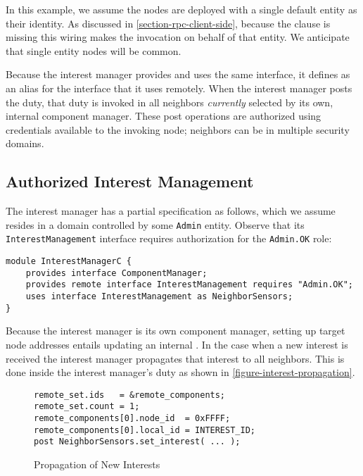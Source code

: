 In this example, we assume the nodes are deployed with a single default
entity as their identity. As discussed in
\autoref{section-rpc-client-side}, because the  clause is
missing this wiring makes the invocation on behalf of that entity. We
anticipate that single entity nodes will be common.

Because the interest manager provides and uses the same interface, it
defines  as an alias for the
 interface that it uses remotely. When the
interest manager posts the  duty, that duty is
invoked in all neighbors \emph{currently} selected by its own, internal
component manager. These post operations are authorized using
credentials available to the invoking node; neighbors can be in multiple
security domains.

\subsection{Authorized Interest Management}

The interest manager has a partial specification as follows, which we
assume resides in a domain controlled by some \texttt{Admin} entity.
Observe that its \texttt{InterestManagement} interface requires
authorization for the \texttt{Admin.OK} role:

\begin{lrbox}{\savebigbox}
\begin{minipage}{4.9in}
\vspace{0.6em}
\begin{Verbatim}[fontsize=\small]
module InterestManagerC {
    provides interface ComponentManager;
    provides remote interface InterestManagement requires "Admin.OK";
    uses interface InterestManagement as NeighborSensors;
}
\end{Verbatim}
\vspace{0.3em}
\end{minipage}
\end{lrbox}
\centerline{\usebox{\savebigbox}}

Because the interest manager is its own component manager, setting up
target node addresses entails updating an internal
. In the case when a new interest is received the
interest manager propagates that interest to all neighbors. This is done
inside the interest manager's  duty as shown in
\autoref{figure-interest-propagation}.

\begin{figure}[!t]
\begin{textbox}{3.25in}
\begin{Verbatim}[fontsize=\small]
remote_set.ids   = &remote_components;
remote_set.count = 1;
remote_components[0].node_id  = 0xFFFF;
remote_components[0].local_id = INTEREST_ID;
post NeighborSensors.set_interest( ... );
\end{Verbatim}
\end{textbox}
\caption{Propagation of New Interests}
\label{figure-interest-propagation}
\end{figure}

